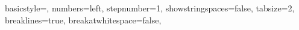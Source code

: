 \hypersetup{
	colorlinks=true,
	linkcolor=blue,
	filecolor=magenta,      
	urlcolor=red,
	citecolor=lime!50!black,
}


\geometry{a4paper, left=25mm, right=25mm, top=30mm, bottom=30mm}

\date{\today}
\lhead{\thedate}
\lhead{\thetitle}
\pagestyle{fancy}

\usetikzlibrary{patterns}
\usetikzlibrary{3d}

\author{Author 1\\(number) \and Author 2\\(number) \and Author 3\\(number)}
\allowdisplaybreaks

\lstset
{ %
    basicstyle=\footnotesize,
    numbers=left,
    stepnumber=1,
    showstringspaces=false,
    tabsize=2,
    breaklines=true,
    breakatwhitespace=false,
}
